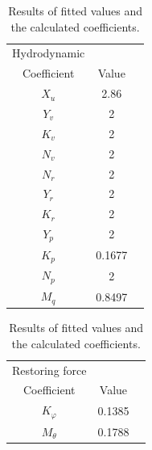 \begin{table}[htbp]
\centering
\begin{tabular}{ccc}
	\toprule
  Hydrodynamic\\Coefficient & Value \\
  \midrule
  $X_u$ & 2.86 \\
  $Y_v$ & 2 \\
  $K_v$ & 2 \\
  $N_v$ & 2 \\
  $N_r$ & 2 \\
  $Y_r$ & 2 \\
  $K_r$ & 2 \\
  $Y_p$ & 2 \\
  $K_p$ & 0.1677 \\
  $N_p$ & 2 \\
  $M_q$ & 0.8497 \\
	\bottomrule
\end{tabular}
\caption{Results of fitted values and the calculated coefficients.}
\label{tab:dmatrix}
\end{table}

\begin{table}[htbp]
\centering
\begin{tabular}{ccc}
	\toprule
  Restoring force\\Coefficient & Value \\
  \midrule
  $K_\varphi$ & 0.1385 \\
  $M_\theta$ & 0.1788 \\
  	\bottomrule
\end{tabular}
\caption{Results of fitted values and the calculated coefficients.}
\label{tab:gmatrix}
\end{table}

